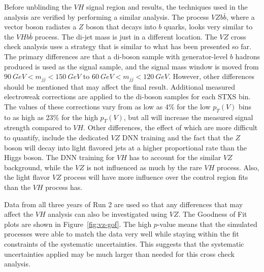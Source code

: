 Before unblinding the $V\!H$ signal region and results, the techniques used in the analysis are
verified by performing a similar analysis.
The process $V\!Zb\bar{b}$, where a vector boson radiates a $Z$ boson that decays into $b$ quarks,
looks very similar to the $V\!Hb\bar{b}$ process.
The di-jet mass is just in a different location.
The $V\!Z$ cross check analysis uses a strategy that is similar to what has been presented so far.
The primary differences are that a di-boson sample with generator-level $b$ hadrons produced
is used as the signal sample, and the signal mass window is moved from $\SI{90}{GeV} < m_{jj} < \SI{150}{GeV}$
to  $\SI{60}{GeV} < m_{jj} < \SI{120}{GeV}$.
However, other differences should be mentioned that may affect the final result.
Additional measured electroweak corrections are applied to the di-boson samples for each STXS bin.
The values of these corrections vary from as low as 4\% for the low $p_T(V)$ bins
to as high as 23\% for the high $p_T(V)$, but all will increase the measured signal strength compared to $V\!H$.
Other differences, the effect of which are more difficult to quantify, include the dedicated $V\!Z$ DNN training and
the fact that the $Z$ boson will decay into light flavored jets at a higher proportional rate than the Higgs boson.
The DNN training for $V\!H$ has to account for the similar $V\!Z$ background,
while the $V\!Z$ is not influenced as much by the rare $V\!H$ process.
Also, the light flavor $V\!Z$ process will have more influence over
the control region fits than the $V\!H$ process has.

Data from all three years of Run 2 are used so that any differences that may affect the $V\!H$ analysis
can also be investigated using $V\!Z$.
The Goodness of Fit plots are shown in Figure~\ref{fig:vz-gof}.
The high $p$-value means that the simulated processes were able to match the data very well
while staying within the fit constraints of the systematic uncertainties.
This suggests that the systematic uncertainties applied may be much larger than needed for this cross check analysis.

